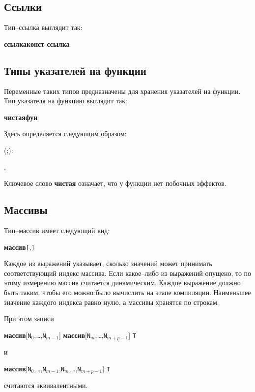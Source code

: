 \documentclass[10pt]{report}
\begin{document}
\subsection{Ссылки}
Тип--ссылка выглядит так:        
\begin{center}
	\rbo\textbf{ссылка}\sor\textbf{конст ссылка}\rbc{}
\end{center}      

\subsection{Типы указателей на функции}
Переменные таких типов предназначены для хранения указателей на функции. Тип указателя на функцию выглядит так:
\begin{center}
	\noindent\textbf{чистая}\optional \textbf{фун} 
\end{center}

Здесь определяется следующим образом:

\is(\rbo{}\rbo;\rbc\kleene\rbc\optional):

\is{}\rbo,\rbc\kleene

\is{}

Ключевое слово \textbf{чистая} означает, что у функции нет побочных эффектов. 

\subsection{Массивы}
Тип--массив имеет следующий вид:
\begin{center}
	\textbf{массив}\texttt{[}\optional\rbo,\optional\rbc\kleene\texttt{]} 
\end{center}

Каждое из выражений указывает, сколько значений может принимать соответствующий индекс массива. Если какое--либо из выражений опущено, то по этому измерению массив считается динамическим. Каждое выражение должно быть таким, чтобы его можно было вычислить на этапе компиляции. Наименьшее значение каждого индекса равно нулю, а массивы хранятся по строкам.

При этом записи
\begin{center}
	\textbf{массив}[\texttt{N}$_0$,\dots,\texttt{N}$_{m-1}$] \textbf{массив}[\texttt{N}$_{m}$,\dots,\texttt{N}$_{m+p-1}$] \texttt{T}
\end{center}
и
\begin{center}
	\textbf{массив}[\texttt{N}$_0$,\dots,\texttt{N}$_{m-1}$,\texttt{N}$_{m}$,\dots,\texttt{N}$_{m+p-1}$] \texttt{T}
\end{center}
считаются эквивалентными.
\end{document}
